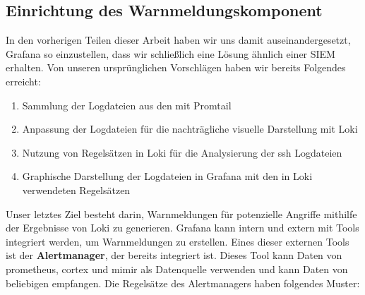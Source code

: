 
\subsection{Einrichtung des Warnmeldungskomponent}
In den vorherigen Teilen dieser Arbeit haben wir uns damit auseinandergesetzt, Grafana so einzustellen, dass wir schließlich eine Lösung ähnlich einer \gls{SIEM} erhalten. Von unseren ursprünglichen Vorschlägen haben wir bereits Folgendes erreicht:

{
\begin{enumerate}[noitemsep]
   \item	Sammlung der Logdateien aus den  mit Promtail
   \item Anpassung der Logdateien für die nachträgliche visuelle Darstellung mit Loki
   \item Nutzung von Regelsätzen in Loki für die Analysierung der \gls{ssh} Logdateien
   \item Graphische Darstellung der Logdateien in Grafana mit den in Loki verwendeten Regelsätzen
\end{enumerate}
}
Unser letztes Ziel besteht darin, Warnmeldungen für potenzielle Angriffe mithilfe der Ergebnisse von Loki zu generieren. Grafana kann intern und extern mit Tools integriert werden, um Warnmeldungen zu erstellen. Eines dieser externen Tools ist der \textbf{Alertmanager}, der bereits integriert ist. Dieses Tool kann Daten von \gls{prometheus}, \gls{cortex} und \gls{mimir} als Datenquelle verwenden \citep{Grafana_Alertmanager} und kann Daten von beliebigen  empfangen. Die Regelsätze des Alertmanagers haben folgendes Muster:

